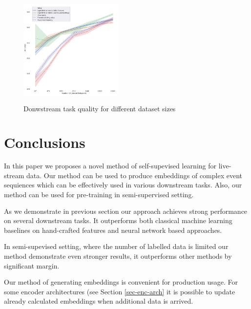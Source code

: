 \documentclass[sigconf]{acmart}
\begin{document}

\begin{figure}[ht]
  \caption{Donwstream task quality for different dataset sizes}
  \includegraphics[width=0.46\textwidth]{figures/semi_supervised_setup.png}
  \label{fig-semi}
\end{figure}

\section{Conclusions} \label{sec-conclusions}

In this paper we proposes a novel method of self-supevised learning for live-stream data. Our method can be used to produce embeddings of complex event sequiences which can be effectively used in various downstream tasks. Also, our method can be used for pre-training in semi-supervised setting.

As we demonstrate in previous section our approach achieves strong performance on several downstream tasks. It outperforms both classical machine learning baselines on hand-crafted features and neural network based approaches.

In semi-supevised setting, where the number of labelled data is limited our method demonstrate even stronger results, it outperforms other methods by significant margin.

Our method of generating embeddings is convenient for production usage. For some encoder architectures (see Section \ref{sec-enc-arch} it is possible to update already calculated embeddings when additional data is arrived.



\end{document}
